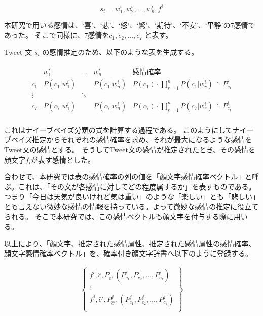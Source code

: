 \documentclass[11pt,a4j]{jsarticle}
\begin{document}
\[
s_i=w^i_1,w^i_2,\ldots,w_n^i,f^i
\]

本研究で用いる感情は、`喜'、`悲'、`怒'、`驚'、`期待'、`不安'、`平静'の7感情であった。
そこで同様に、7感情を$c_1, c_2, \ldots, c_7$ と表す。

Tweet 文 $s_i$ の感情推定のため、以下のような表を生成する。

\begin{eqnarray*}
  \begin{array}{r|ccc|l}
        & w^i_1        & \ldots          & w^{i}_{n}    & 感情確率 \\ \hline
    c_1 & P(c_1|w^i_1) &                 & P(c_1|w^i_n) & P(c_1) \cdot \prod_{r=1}^{n}P(c_1|w^i_r) \doteq P^i_{c_1}\\
 \vdots &              & \ddots          &              & \\
    c_7 & P(c_7|w^i_1) &                 & P(c_7|w^i_n) & P(c_7) \cdot \prod_{r=1}^{n}P(c_7|w^i_r) \doteq P^i_{c_7}\\
  \end{array}
\end{eqnarray*}

これはナイーブベイズ分類の式を計算する過程である。
このようにしてナイーブベイズ推定からそれぞれの感情確率を求め、それが最大になるような感情をTweet文の感情とする。
そうしてTweet文の感情が推定されたとき、その感情を顔文字$f_i$が表す感情とした。

合わせて、本研究では表の感情確率の列の値を「顔文字感情確率ベクトル」と呼ぶ。これは、「その文が各感情に対してどの程度属するか」を表すものである。
つまり「今日は天気が良いけれど気は重い」のような「楽しい」とも「悲しい」とも言えない微妙な感情の情報を持っている。よって微妙な感情の推定に役立てられる。
そこで本研究では、この感情ベクトルも顔文字を付与する際に用いる。

以上により、「顔文字、推定された感情属性、推定された感情属性の感情確率、顔文字感情確率ベクトル」を、確率付き顔文字辞書へ以下のように登録する。

\begin{eqnarray*}
  \left\{
   \begin{array}{c}
     f^i, \hat{c}, P^i_{\hat{c}}, (P^i_{c_1}, P^i_{c_2}, \ldots, P^i_{c_7})\\
     \vdots \\
     f^j, \hat{c}', P^j_{\hat{c}'}, (P^j_{c_1}, P^j_{c_2}, \ldots, P^j_{c_7})\\
   \end{array}
  \right\}
\end{eqnarray*}
\end{document}
